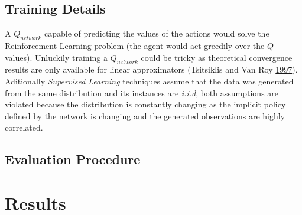 \documentclass[
  openany]{book}
\begin{document}
\hypertarget{training-details}{%
\subsection{Training Details}\label{training-details}}

A \(Q_{network}\) capable of predicting the values of the actions would solve the Reinforcement Learning problem (the agent would act greedily over the \(Q\)-values). Unluckily training a \(Q_{network}\) could be tricky as theoretical convergence results are only available for linear approximators (Tsitsiklis and Van Roy \protect\hyperlink{ref-tsitsiklis1997analysis}{1997}). Aditionally \emph{Supervised Learning} techniques assume that the data was generated from the same distribution and its instances are \emph{i.i.d}, both assumptions are violated because the distribution is constantly changing as the implicit policy defined by the network is changing and the generated observations are highly correlated.

\hypertarget{evaluation-procedure}{%
\subsection{Evaluation Procedure}\label{evaluation-procedure}}

\hypertarget{results}{%
\section{Results}\label{results}}
\end{document}
